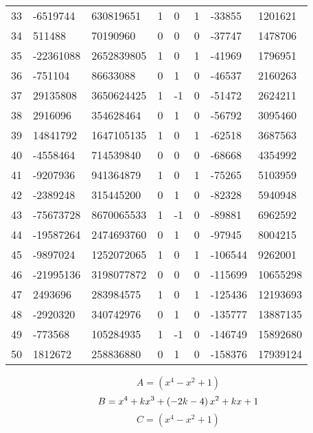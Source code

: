 \documentclass{amsart}
\begin{document}
\begin{longtable}{|l|l|l|lllll|}
33&-6519744&630819651&1&0&1&-33855&1201621\\
34&511488&70190960&0&0&0&-37747&1478706\\
35&-22361088&2652839805&1&0&1&-41969&1796951\\
36&-751104&86633088&0&1&0&-46537&2160263\\
37&29135808&3650624425&1&-1&0&-51472&2624211\\
38&2916096&354628464&0&1&0&-56792&3095460\\
39&14841792&1647105135&1&0&1&-62518&3687563\\
40&-4558464&714539840&0&0&0&-68668&4354992\\
41&-9207936&941364879&1&0&1&-75265&5103959\\
42&-2389248&315445200&0&1&0&-82328&5940948\\
43&-75673728&8670065533&1&-1&0&-89881&6962592\\
44&-19587264&2474693760&0&1&0&-97945&8004215\\
45&-9897024&1252072065&1&0&1&-106544&9262001\\
46&-21995136&3198077872&0&0&0&-115699&10655298\\
47&2493696&283984575&1&0&1&-125436&12193693\\
48&-2920320&340742976&0&1&0&-135777&13887135\\
49&-773568&105284935&1&-1&0&-146749&15892680\\
50&1812672&258836880&0&1&0&-158376&17939124\\
\hline
\end{longtable}
$$A=(x^4
 - x^2
 + 1)$$
$$B=x^4
 + k\*x^3
 + \left(-2\*k
 - 4\right) \*x^2
 + k\*x
 + 1$$
$$C=(x^4
 - x^2
 + 1)$$
\end{document}
